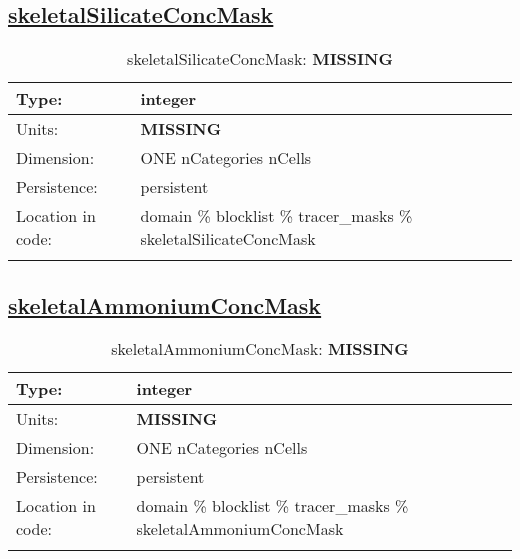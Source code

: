 \subsection[skeletalSilicateConcMask]{\hyperref[sec:var_tab_tracer_masks]{skeletalSilicateConcMask}}
\label{subsec:var_sec_tracer_masks_skeletalSilicateConcMask}
\begin{center}
\begin{longtable}{| p{2.0in} | p{4.0in} |}
        \hline 
        Type: & integer \\
        \hline 
        Units: & {\bf \color{red} MISSING} \\
        \hline 
        Dimension: & ONE nCategories nCells \\
        \hline 
        Persistence: & persistent \\
        \hline 
         Location in code: & domain \% blocklist \% tracer\_masks \% skeletalSilicateConcMask \\
         \hline 
    \caption{skeletalSilicateConcMask: {\bf \color{red} MISSING}}
\end{longtable}
\end{center}
\subsection[skeletalAmmoniumConcMask]{\hyperref[sec:var_tab_tracer_masks]{skeletalAmmoniumConcMask}}
\label{subsec:var_sec_tracer_masks_skeletalAmmoniumConcMask}
\begin{center}
\begin{longtable}{| p{2.0in} | p{4.0in} |}
        \hline 
        Type: & integer \\
        \hline 
        Units: & {\bf \color{red} MISSING} \\
        \hline 
        Dimension: & ONE nCategories nCells \\
        \hline 
        Persistence: & persistent \\
        \hline 
         Location in code: & domain \% blocklist \% tracer\_masks \% skeletalAmmoniumConcMask \\
         \hline 
    \caption{skeletalAmmoniumConcMask: {\bf \color{red} MISSING}}
\end{longtable}
\end{center}
